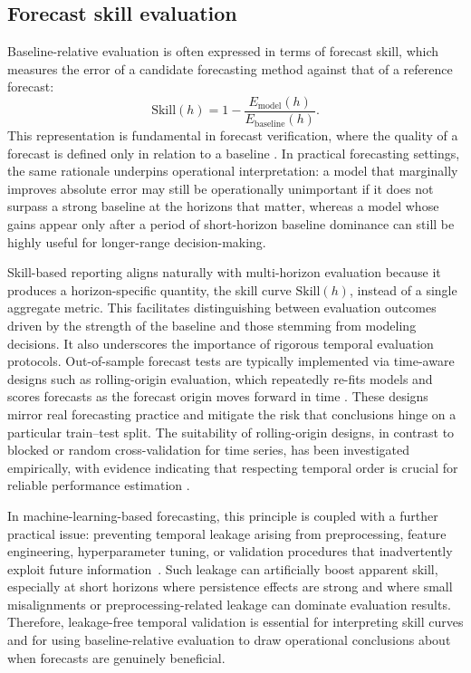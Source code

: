 \documentclass[pdflatex]{sn-jnl}
\begin{document}
\subsection{Forecast skill evaluation}

Baseline-relative evaluation is often expressed in terms of forecast
skill, which measures the error of a candidate forecasting method
against that of a reference forecast:
\begin{equation}
\mathrm{Skill}(h) = 1 - \frac{E_{\mathrm{model}}(h)}{E_{\mathrm{baseline}}(h)}.
\end{equation}
This representation is fundamental in forecast verification, where the
quality of a forecast is defined only in relation to a baseline
\citep{murphy1993}. In practical forecasting settings, the same rationale
underpins operational interpretation: a model that marginally improves
absolute error may still be operationally unimportant if it does not
surpass a strong baseline at the horizons that matter, whereas a model
whose gains appear only after a period of short-horizon baseline
dominance can still be highly useful for longer-range decision-making.

Skill-based reporting aligns naturally with multi-horizon evaluation
because it produces a horizon-specific quantity, the skill curve
$\mathrm{Skill}(h)$, instead of a single aggregate metric. This
facilitates distinguishing between evaluation outcomes driven by the
strength of the baseline and those stemming from modeling decisions. It
also underscores the importance of rigorous temporal evaluation
protocols. Out-of-sample forecast tests are typically implemented via
time-aware designs such as rolling-origin evaluation, which repeatedly
re-fits models and scores forecasts as the forecast origin moves forward
in time \citep{tashman2000}. These designs mirror real forecasting
practice and mitigate the risk that conclusions hinge on a particular
train--test split. The suitability of rolling-origin designs, in
contrast to blocked or random cross-validation for time series, has been
investigated empirically, with evidence indicating that respecting
temporal order is crucial for reliable performance estimation
\citep{cerqueira2020, bergmeir2012}.

In machine-learning-based forecasting, this principle is coupled with a
further practical issue: preventing temporal leakage arising from
preprocessing, feature engineering, hyperparameter tuning, or validation
procedures that inadvertently exploit future information~\citep{kapoor2023leakage}. Such leakage
can artificially boost apparent skill, especially at short horizons where
persistence effects are strong and where small misalignments or
preprocessing-related leakage can dominate evaluation results. Therefore,
leakage-free temporal validation is essential for interpreting skill
curves and for using baseline-relative evaluation to draw operational
conclusions about when forecasts are genuinely beneficial.
\end{document}
